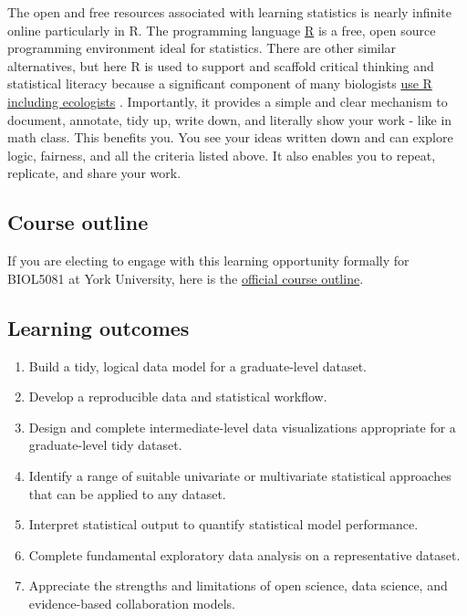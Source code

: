\documentclass[
]{book}
\providecommand{\tightlist}{%
  \setlength{\itemsep}{0pt}\setlength{\parskip}{0pt}}
\begin{document}
The open and free resources associated with learning statistics is nearly infinite online particularly in R. The programming language \href{https://www.r-project.org}{R} is a free, open source programming environment ideal for statistics. There are other similar alternatives, but here R is used to support and scaffold critical thinking and statistical literacy because a significant component of many biologists \href{https://esajournals.onlinelibrary.wiley.com/doi/full/10.1002/ecs2.2567}{use R including ecologists} \citep{RN6098}. Importantly, it provides a simple and clear mechanism to document, annotate, tidy up, write down, and literally show your work - like in math class. This benefits you. You see your ideas written down and can explore logic, fairness, and all the criteria listed above. It also enables you to repeat, replicate, and share your work.

\hypertarget{course-outline}{%
\subsection*{Course outline}\label{course-outline}}

If you are electing to engage with this learning opportunity formally for BIOL5081 at York University, here is the \href{https://figshare.com/articles/online_resource/BIOL_5081_Course_Outline_2021/14901087}{official course outline}.

\hypertarget{learning-outcomes}{%
\subsection*{Learning outcomes}\label{learning-outcomes}}

\begin{enumerate}
\def\labelenumi{\arabic{enumi}.}
\tightlist
\item
  Build a tidy, logical data model for a graduate-level dataset.\\
\item
  Develop a reproducible data and statistical workflow.\\
\item
  Design and complete intermediate-level data visualizations appropriate for a graduate-level tidy dataset.\\
\item
  Identify a range of suitable univariate or multivariate statistical approaches that can be applied to any dataset.\\
\item
  Interpret statistical output to quantify statistical model performance.\\
\item
  Complete fundamental exploratory data analysis on a representative dataset.\\
\item
  Appreciate the strengths and limitations of open science, data science, and evidence-based collaboration models.
\end{enumerate}
\end{document}
